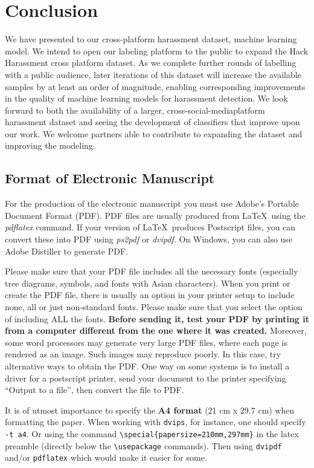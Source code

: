 \documentclass[11pt,a4paper]{article}
\begin{document}
\section{Conclusion}
We have presented to our cross-platform harassment
dataset, machine learning model. We intend
to open our labeling platform to the public to expand
the Hack Harassment cross platform dataset.
As we complete further rounds of labelling with a
public audience, later iterations of this dataset will
increase the available samples by at least an order
of magnitude, enabling corresponding improvements
in the quality of machine learning models
for harassment detection. We look forward to both
the availability of a larger, cross-social-mediaplatform
harassment dataset and seeing the development
of classifiers that improve upon our work.
We welcome partners able to contribute to expanding
the dataset and improving the modeling.

\subsection{Format of Electronic Manuscript}
\label{sect:pdf}

For the production of the electronic manuscript you must use Adobe's
Portable Document Format (PDF). PDF files are usually produced from
\LaTeX\ using the \textit{pdflatex} command. If your version of
\LaTeX\ produces Postscript files, you can convert these into PDF
using \textit{ps2pdf} or \textit{dvipdf}. On Windows, you can also use
Adobe Distiller to generate PDF.

Please make sure that your PDF file includes all the necessary fonts
(especially tree diagrams, symbols, and fonts with Asian
characters). When you print or create the PDF file, there is usually
an option in your printer setup to include none, all or just
non-standard fonts.  Please make sure that you select the option of
including ALL the fonts. \textbf{Before sending it, test your PDF by
  printing it from a computer different from the one where it was
  created.} Moreover, some word processors may generate very large PDF
files, where each page is rendered as an image. Such images may
reproduce poorly. In this case, try alternative ways to obtain the
PDF. One way on some systems is to install a driver for a postscript
printer, send your document to the printer specifying ``Output to a
file'', then convert the file to PDF.

It is of utmost importance to specify the \textbf{A4 format} (21 cm
x 29.7 cm) when formatting the paper. When working with
{\tt dvips}, for instance, one should specify {\tt -t a4}.
Or using the command \verb|\special{papersize=210mm,297mm}| in the latex
preamble (directly below the \verb|\usepackage| commands). Then using 
{\tt dvipdf} and/or {\tt pdflatex} which would make it easier for some.
\end{document}
